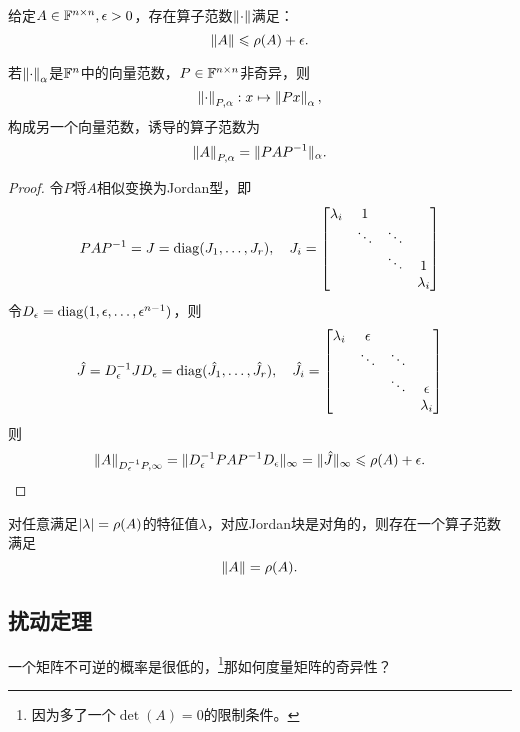 \begin{theorem}
    {}{}
    给定$A\in\mathbb F^{n\times n},\epsilon>0$，存在算子范数$\left\lVert\cdot\right\rVert$满足：
    \begin{equation}
        \left\lVert A\right\rVert\leqslant\rho(A)+\epsilon.
    \end{equation}
\end{theorem}

\begin{lemma}
    若$\left\lVert\cdot\right\rVert_\alpha$是$\mathbb F^n$中的向量范数，$P\in\mathbb F^{n\times n}$非奇异，则
    \[
        \left\lVert\cdot\right\rVert_{P,\alpha}:x\mapsto\left\lVert Px\right\rVert_\alpha,
    \]
    构成另一个向量范数，诱导的算子范数为
    \[
        \left\lVert A\right\rVert_{P,\alpha}=\lVert PAP^{-1}\rVert_\alpha.
    \]
\end{lemma}

\begin{proof}
    令$P$将$A$相似变换为Jordan型，即
    \[
        PAP^{-1}=J=\operatorname{diag}(J_1,\ldots,J_r),\quad J_i=\begin{bmatrix}
            \lambda_i&1\\
            &\ddots&\ddots\\
            &&\ddots&1\\
            &&&\lambda_i
        \end{bmatrix}
    \]
    令$D_\epsilon=\operatorname{diag}(1,\epsilon,\ldots,\epsilon^{n-1})$，则 
    \[
        \hat J=D_\epsilon^{-1} JD_\epsilon=\operatorname{diag}(\hat J_1,\ldots,\hat J_r),\quad\hat J_i=\begin{bmatrix}
            \lambda_i&\epsilon\\
            &\ddots&\ddots\\
            &&\ddots&\epsilon\\
            &&&\lambda_i
        \end{bmatrix}
    \]
    则
    \[
        \left\lVert A\right\rVert_{D_\epsilon^{-1} P,\infty}=\lVert D_\epsilon^{-1} PAP^{-1} D_\epsilon\rVert_\infty=\lVert\hat J\rVert_\infty\leqslant\rho(A)+\epsilon.
        \qedhere
    \]
\end{proof}

\begin{remark}
    对任意满足$\left\lvert\lambda\right\rvert=\rho(A)$的特征值$\lambda$，对应Jordan块是对角的，则存在一个算子范数满足
    \[
        \left\lVert A\right\rVert=\rho(A).
    \]
\end{remark}

\subsection{扰动定理}

一个矩阵不可逆的概率是很低的，\footnote{因为多了一个$\det(A)=0$的限制条件。}那如何度量矩阵的奇异性？%

